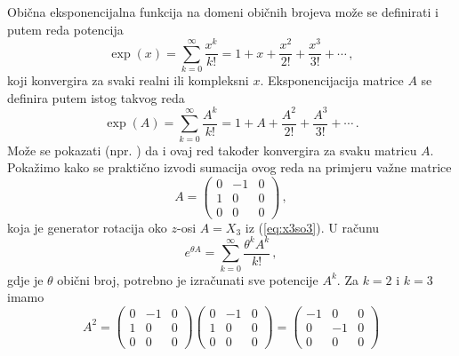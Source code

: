 Obična eksponencijalna funkcija na domeni običnih brojeva može se definirati
i putem reda potencija
\begin{equation}
    \exp(x) = \sum_{k = 0}^{\infty} \frac{x^k}{k!}
    = 1 + x + \frac{x^2}{2!} + \frac{x^3}{3!} + \cdots \,,
\end{equation}
koji konvergira za svaki realni ili kompleksni $x$.
Eksponencijacija matrice $A$ se definira putem istog takvog reda
\begin{equation}
    \exp(A) = \sum_{k = 0}^{\infty} \frac{A^k}{k!}
    = 1 + A + \frac{A^2}{2!} + \frac{A^3}{3!} + \cdots \,.
\end{equation}
Može se pokazati (npr. \cite{Stilwell:2008}) da i ovaj
red također konvergira za svaku matricu $A$.
Pokažimo kako se praktično izvodi sumacija ovog reda na primjeru
važne matrice
\begin{equation}
    A = 
    \begin{pmatrix}
        0 & -1 & 0 \\
        1 &  0 & 0 \\
        0 &  0 & 0 
    \end{pmatrix} \,,
\end{equation}
koja je generator rotacija oko $z$-osi $A=X_3$ iz (\ref{eq:x3so3}).
U računu
\begin{equation}
    e^{\theta A} = \sum_{k = 0}^{\infty} \frac{\theta^k A^k}{k!} \,,
\end{equation}
gdje je $\theta$ obični broj, potrebno je izračunati sve potencije $A^k$.
Za $k=2$ i $k=3$ imamo
\begin{equation}
    A^2 = 
    \begin{pmatrix}
        0 & -1 & 0 \\
        1 &  0 & 0 \\
        0 &  0 & 0 
    \end{pmatrix}
    \begin{pmatrix}
        0 & -1 & 0 \\
        1 &  0 & 0 \\
        0 &  0 & 0 
    \end{pmatrix}  =
    \begin{pmatrix}
        -1 & 0 & 0 \\
         0 & -1 & 0 \\
        0 &  0 & 0 
    \end{pmatrix}
\end{equation}

